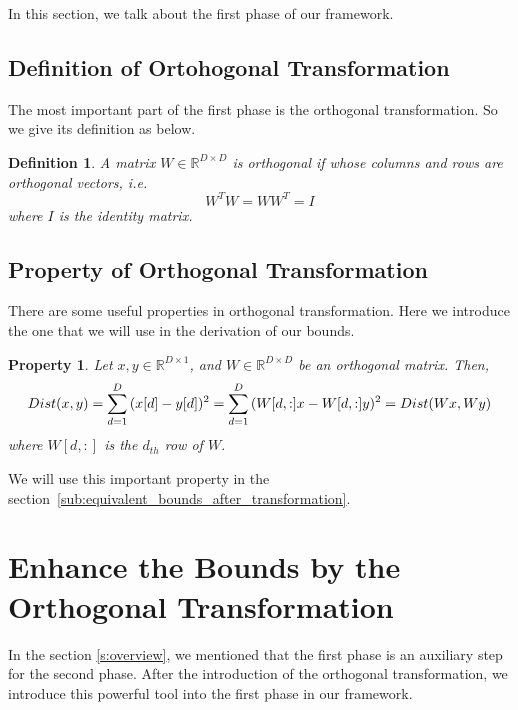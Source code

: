 In this section, we talk about the first phase of our framework.
\subsection{Definition of Ortohogonal Transformation}
\label{ss:ortho_def}

The most important part of the first phase is the orthogonal transformation.  So we give its definition as below.

\newtheorem{Orthogonal}{\bf Definition}
\begin{Orthogonal}
\normalfont
A matrix $W \in\mathbb{R}^{D\times D}$ is orthogonal if whose columns and rows are orthogonal vectors, i.e.
\[
W^{T}W=WW^{T}=I
\]
where $I$ is the identity matrix.
\end{Orthogonal}

\subsection{Property of Orthogonal Transformation}
\label{ss:ortho_prop}

There are some useful properties in orthogonal transformation.  Here we introduce the one that we will use in the derivation of our bounds.

\newtheorem{ProOfOrthogonal}{\bf Property}
\begin{ProOfOrthogonal}
\normalfont
Let $x, y\in\mathbb{R}^{D\times 1}$, and $W\in\mathbb{R}^{D\times D}$ be an orthogonal matrix. Then,
\[
Dist(x,y)=\sum^D_{d=1}{(x[d]-y[d])^2} \\
=\sum^D_{d=1}{(W[d,:]x-W[d,:]y)^2}=Dist(Wx,Wy)
\]
where $W[d,:]$ is the $d_{th}$ row of $W$.
\end{ProOfOrthogonal}

We will use this important property in the section~\ref{sub:equivalent_bounds_after_transformation}.

\section{Enhance the Bounds by the Orthogonal Transformation}
\label{s:ortho_bounds}
In the section \ref{s:overview}, we mentioned that the first phase is an auxiliary step for the second phase.  After the introduction of the orthogonal transformation, we introduce this powerful tool into the first phase in our framework.

